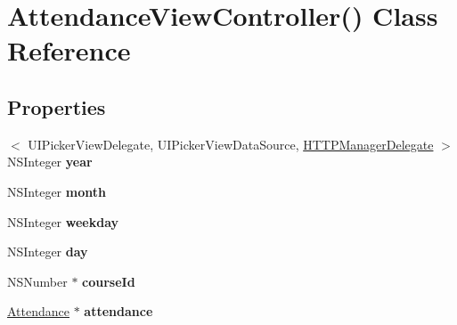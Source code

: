 \hypertarget{interface_attendance_view_controller_07_08}{\section{\-Attendance\-View\-Controller() \-Class \-Reference}
\label{interface_attendance_view_controller_07_08}
}
\subsection*{\-Properties}
\begin{DoxyCompactItemize}
\item 
\hypertarget{interface_attendance_view_controller_07_08_a34c4d9caf76df54be7a948b01b9ba7d6}{$<$ \-U\-I\-Picker\-View\-Delegate, \*
\-U\-I\-Picker\-View\-Data\-Source, \*
\hyperlink{protocol_h_t_t_p_manager_delegate-p}{\-H\-T\-T\-P\-Manager\-Delegate} $>$\*
 \-N\-S\-Integer {\bfseries year}}\label{interface_attendance_view_controller_07_08_a34c4d9caf76df54be7a948b01b9ba7d6}

\item 
\hypertarget{interface_attendance_view_controller_07_08_a9c4c76df4c7accbd2188218875d4d540}{\-N\-S\-Integer {\bfseries month}}\label{interface_attendance_view_controller_07_08_a9c4c76df4c7accbd2188218875d4d540}

\item 
\hypertarget{interface_attendance_view_controller_07_08_a6deb83b9f821d868a6bda6103f1ce3c2}{\-N\-S\-Integer {\bfseries weekday}}\label{interface_attendance_view_controller_07_08_a6deb83b9f821d868a6bda6103f1ce3c2}

\item 
\hypertarget{interface_attendance_view_controller_07_08_ad4822ad39c702fe31da68bcea67b71dd}{\-N\-S\-Integer {\bfseries day}}\label{interface_attendance_view_controller_07_08_ad4822ad39c702fe31da68bcea67b71dd}

\item 
\hypertarget{interface_attendance_view_controller_07_08_ad90f79555495e03b212b34dfc525156d}{\-N\-S\-Number $\ast$ {\bfseries course\-Id}}\label{interface_attendance_view_controller_07_08_ad90f79555495e03b212b34dfc525156d}

\item 
\hypertarget{interface_attendance_view_controller_07_08_adee1e60fff77a34cb6ca3dc730889c91}{\hyperlink{interface_attendance}{\-Attendance} $\ast$ {\bfseries attendance}}\label{interface_attendance_view_controller_07_08_adee1e60fff77a34cb6ca3dc730889c91}


\end{DoxyCompactItemize}
